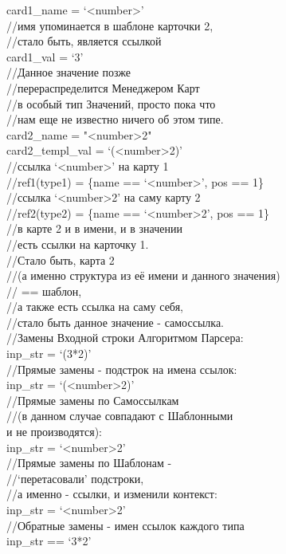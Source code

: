 \documentclass{book}
\newcommand{\less}{\textless}
\newcommand{\more}{\textgreater}
\begin{document}
\begin{tcolorbox}[breakable]
card1\_name = `\less number\more' \\
//имя упоминается в шаблоне карточки 2, \\ 
//стало быть, является ссылкой \\
card1\_val = `3' \\
//Данное значение позже \\
//перераспределится Менеджером Карт \\
//в особый тип Значений, просто пока что \\
//нам еще не известно ничего об этом типе. \\

card2\_name = "\less number\more*2" \\
card2\_templ\_val = `(\less number\more*2)' \\
//ссылка `\less number\more' на карту 1 \\
//ref1(type1) = \{name == `\less number\more', pos == 1\} \\
//ссылка `\less number\more*2' на саму карту 2 \\
//ref2(type2) = \{name == `\less number\more*2', pos == 1\} \\
//в карте 2 и в имени, и в значении \\
//есть ссылки на карточку 1. \\
//Стало быть, карта 2 \\
//(а именно структура из её имени и данного значения) \\
// == шаблон, \\
//а также есть ссылка на саму себя, \\
//стало быть данное значение - самоссылка. \\

//Замены Входной строки Алгоритмом Парсера: \\
inp\_str = `(3*2)' \\

//Прямые замены - подстрок на имена ссылок: \\
inp\_str = `(\less number\more*2)' \\
//Прямые замены по Самоссылкам \\
//(в данном случае совпадают с Шаблонными \\
и не производятся): \\
inp\_str = `\less number\more*2' \\ 
//Прямые замены по Шаблонам - \\
//`перетасовали' подстроки, \\
//а именно - ссылки, и изменили контекст: \\
inp\_str = `\less number\more*2' \\

//Обратные замены - имен ссылок каждого типа \\
inp\_str == `3*2'
\end{tcolorbox}
\end{document}

